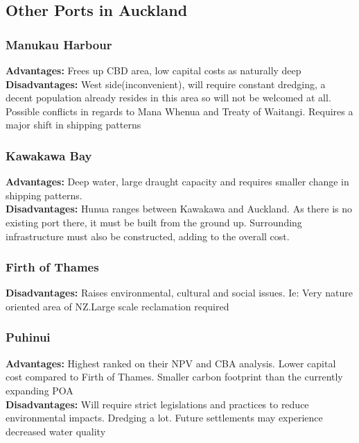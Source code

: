 \begin{multicols}{2}
\subsection*
{Other Ports in Auckland}
    \subsubsection*{Manukau Harbour}
    
        \textbf{Advantages: }{Frees up CBD area, low capital costs as naturally deep}
        \\\textbf{Disadvantages: }{West side(inconvenient), will require constant dredging, a decent population already resides in this area so will not be welcomed at all. Possible conflicts in regards to Mana Whenua and Treaty of Waitangi. Requires a major shift in shipping patterns}
    
    \subsubsection*{Kawakawa Bay}
        \textbf{Advantages: }{Deep water, large draught capacity and requires smaller change in shipping patterns.}
        \\\textbf{Disadvantages: }{Hunua ranges between Kawakawa and Auckland. As there is no existing port there, it must be built from the ground up. Surrounding infrastructure must also be constructed, adding to the overall cost.}
     
    \subsubsection*{Firth of Thames}
        \textbf{Disadvantages: }{Raises environmental, cultural and social issues. Ie: Very nature oriented area of NZ.Large scale reclamation required}
    
    \subsubsection*{Puhinui}
        {\textbf{Advantages: }Highest ranked on their NPV and CBA analysis. Lower capital cost compared to Firth of Thames. Smaller carbon footprint than the currently expanding POA}
        {\\\textbf{Disadvantages: }Will require strict legislations and practices to reduce environmental impacts. Dredging a lot. Future settlements may experience decreased water quality}
    

\end{multicols}
